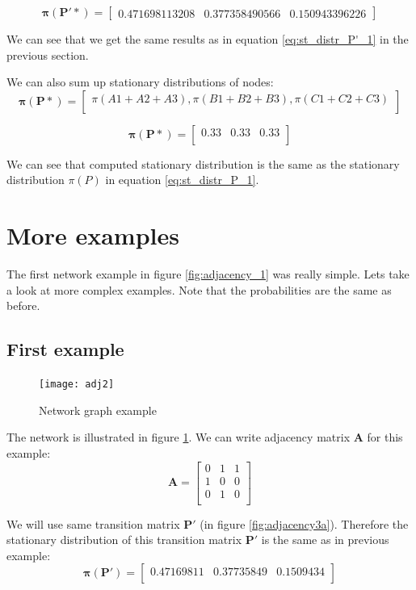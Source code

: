 \documentclass{article}
\begin{document}
\[\mathbf{\pi(P'*)} = \begin{bmatrix}
	0.471698113208 & 0.377358490566 & 0.150943396226
	\end{bmatrix}
\]

We can see that we get the same results as in equation \ref{eq:st_distr_P'_1} in the previous section.

We can also sum up stationary distributions of nodes:
\[\mathbf{\pi(P*)} = 
\begin{bmatrix}
\pi(A1+A2+A3), \pi(B1+B2+B3), \pi(C1+C2+C3) \\
\end{bmatrix}
\]

\[\mathbf{\pi(P*)} = 
\begin{bmatrix}
0.33 & 0.33 & 0.33 \\
\end{bmatrix}
\]

We can see that computed stationary distribution is the same as the stationary distribution $\pi(P)$ in equation \ref{eq:st_distr_P_1}.

\section{More examples}
The first network example in figure \ref{fig:adjacency_1} was really simple. Lets take a look at more complex examples. Note that the probabilities are the same as before.

\subsection{First example}

\begin{figure}
\centering
\texttt{[image: adj2]}
\caption{Network graph example}
\label{fig:adj2}
\end{figure}
The network is illustrated in figure \ref{fig:adj2}. We can write adjacency matrix $\mathbf{A}$ for this example:
\[\mathbf{A} = 
\begin{bmatrix}
0  & 1  & 1 \\
1 & 0 & 0 \\
0 & 1 & 0\\
\end{bmatrix}
\]

We will use same transition matrix $\mathbf{P'}$ (in figure \ref{fig:adjacency3a}). Therefore the stationary distribution of this transition matrix $\mathbf{P'}$ is the same as in previous example:
\begin{equation}
\mathbf{\pi(P')} = \begin{bmatrix}
	0.47169811 &  0.37735849 & 0.1509434\\
	\end{bmatrix}
	\label{eq:st_distr_P'_2}
\end{equation}
\end{document}
